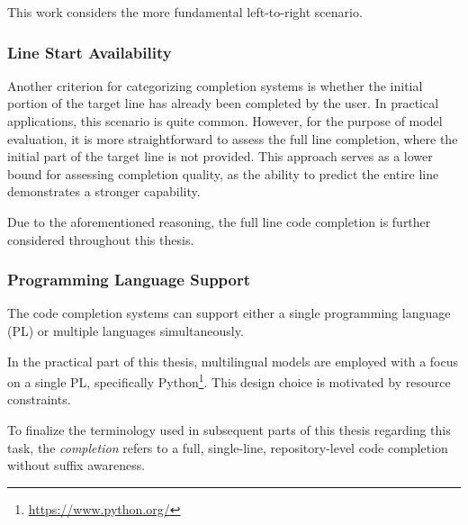 This work considers the more fundamental left-to-right scenario. %

\subsubsection*{Line Start Availability}

Another criterion for categorizing completion systems is whether the initial portion of the target line has already been completed by the user. In practical applications, this scenario is quite common. However, for the purpose of model evaluation, it is more straightforward to assess the full line completion, where the initial part of the target line is not provided. This approach serves as a lower bound for assessing completion quality, as the ability to predict the entire line demonstrates a stronger capability.

Due to the aforementioned reasoning, the full line code completion is further considered throughout this thesis.

\subsubsection*{Programming Language Support}

The code completion systems can support either a single programming language (PL) or multiple languages simultaneously.

In the practical part of this thesis, multilingual models are employed with a focus on a single PL, specifically Python\footnote{\url{https://www.python.org/}}. This design choice is motivated by resource constraints.
\medskip

To finalize the terminology used in subsequent parts of this thesis regarding this task, the \textit{completion} refers to a full, single-line, repository-level code completion without suffix awareness.
